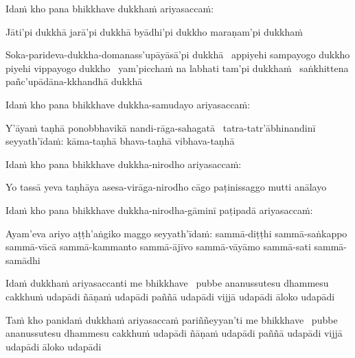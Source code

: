 \begin{pali-hang}
  Idaṁ kho pana bhikkhave dukkhaṁ ariyasaccaṁ:
\end{pali-hang}

\begin{pali-hang}
  Jāti'pi dukkhā jarā'pi dukkhā byādhi'pi dukkho maraṇam'pi dukkhaṁ
\end{pali-hang}

\begin{pali-hang}
   Soka-parideva-dukkha-domanass'upāyāsā'pi dukkhā \breathmark\ appiyehi sampayogo dukkho piyehi vippayogo dukkho \breathmark\ yam'picchaṁ na labhati tam'pi dukkhaṁ \breathmark\ saṅkhittena pañc'upādāna-kkhandhā dukkhā
\end{pali-hang}

\begin{pali-hang}
  Idaṁ kho pana bhikkhave dukkha-samudayo ariyasaccaṁ:
\end{pali-hang}

\begin{pali-hang}
  Y'āyaṁ taṇhā ponobbhavikā nandi-rāga-sahagatā \breathmark\ tatra-tatr'ābhinandinī seyyath'īdaṁ: kāma-taṇhā bhava-taṇhā vibhava-taṇhā
\end{pali-hang}

\begin{pali-hang}
  Idaṁ kho pana bhikkhave dukkha-nirodho ariyasaccaṁ:
\end{pali-hang}

\begin{pali-hang}
  Yo tassā yeva taṇhāya asesa-virāga-nirodho cāgo paṭinissaggo mutti anālayo
\end{pali-hang}

\begin{pali-hang}
  Idaṁ kho pana bhikkhave dukkha-nirodha-gāminī paṭipadā ariyasaccaṁ:
\end{pali-hang}

\begin{pali-hang}
  Ayam'eva ariyo aṭṭh'aṅgiko maggo seyyath'īdaṁ: sammā-diṭṭhi sammā-saṅkappo sammā-vācā sammā-kammanto sammā-ājīvo sammā-vāyāmo sammā-sati sammā-samādhi
\end{pali-hang}

\begin{pali-hang}
  Idaṁ dukkhaṁ ariyasaccanti me bhikkhave \breathmark\ pubbe ananussutesu dhammesu cakkhuṁ udapādi ñāṇaṁ udapādi paññā udapādi vijjā udapādi āloko udapādi
\end{pali-hang}

\begin{pali-hang}
  Taṁ kho panidaṁ dukkhaṁ ariyasaccaṁ pariññeyyan'ti me bhikkhave \breathmark\ pubbe ananussutesu dhammesu cakkhuṁ udapādi ñāṇaṁ udapādi paññā udapādi vijjā udapādi āloko udapādi
\end{pali-hang}

